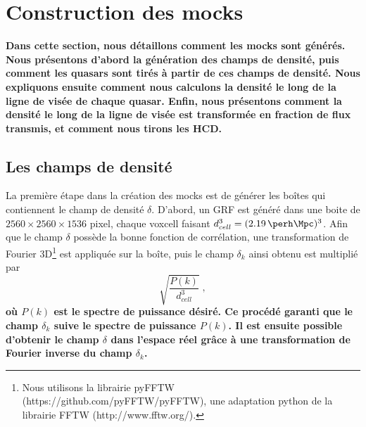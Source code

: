 \documentclass[11pt, twoside, a4paper, openright]{report}
\begin{document}
\section{Construction des mocks}
\textbf{Dans cette section, nous détaillons comment les mocks sont générés.
Nous présentons d'abord la génération des champs de densité,
puis comment les quasars sont tirés à partir de ces champs de densité.
Nous expliquons ensuite comment nous calculons la densité le long de la ligne de visée de chaque quasar.
Enfin, nous présentons comment la densité le long de la ligne de visée est transformée en fraction de flux transmis, et comment nous tirons les HCD.}


\subsection{Les champs de densité}
\label{subsec:densityfields}
La première étape dans la création des mocks est de générer les boîtes qui contiennent le champ de densité $\delta$. D'abord, un GRF est généré dans une boite de $\num{2560}\times\num{2560}\times\num{1536}$ pixel, chaque voxcell faisant  $d_{cell}^3 = (\SI{2.19}{\perh\Mpc})^3$.
Afin que le champ $\delta$ possède la bonne fonction de corrélation, une transformation de Fourier 3D\footnote{Nous utilisons la librairie pyFFTW (https://github.com/pyFFTW/pyFFTW), une adaptation python de la librairie FFTW (http://www.fftw.org/).} est appliquée sur la boîte, puis le champ $\delta_k$ ainsi obtenu est multiplié par
\begin{equation}
  \sqrt{\frac{P(k)}{d_{cell}^3}} \; ,
\end{equation}
\textbf{où $P(k)$ est le spectre de puissance désiré. Ce procédé garanti que le champ $\delta_k$ suive le spectre de puissance $P(k)$. Il est ensuite possible d'obtenir le champ $\delta$ dans l'espace réel grâce à une transformation de Fourier inverse du champ $\delta_k$.}
\end{document}
